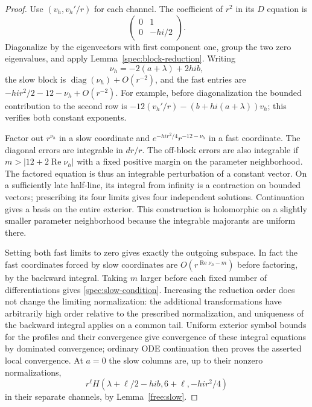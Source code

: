 \documentclass[11pt]{article}
\numberwithin{equation}{section}
\theoremstyle{definition}
\theoremstyle{remark}
\begin{document}
\begin{proof}
Use $(v_h,v_h'/r)$ for each channel. The coefficient of $r^2$ in its
$D$ equation is
\[
 \begin{pmatrix}0&1\\0&-hi/2\end{pmatrix}.
\]
Diagonalize by the eigenvectors with first component one, group the
two zero eigenvalues, and apply Lemma~\ref{spec:block-reduction}.
Writing
\[
 \nu_h=-2(a+\lambda)+2hib,
\]
the slow block is $\operatorname{diag}(\nu_h)+O(r^{-2})$, and the fast
entries are $-hi r^2/2-12-\nu_h+O(r^{-2})$.
For example, before diagonalization the bounded contribution to the
second row is $-12(v_h'/r)-(b+hi(a+\lambda))v_h$; this verifies both
constant exponents.

Factor out $r^{\nu_h}$ in a slow coordinate and
$e^{-hi r^2/4}r^{-12-\nu_h}$ in a fast coordinate. The diagonal errors
are integrable in $d r/r$. The off-block errors are also integrable if
$m>|12+2\operatorname{Re}\nu_h|$ with a fixed positive margin on the
parameter neighborhood. The factored equation is thus an integrable
perturbation of a constant vector. On a sufficiently late half-line,
its integral from infinity is a contraction on bounded vectors;
prescribing its four limits gives four independent solutions.
Continuation gives a basis on the entire exterior. This construction
is holomorphic on a slightly smaller parameter neighborhood because
the integrable majorants are uniform there.

Setting both fast limits to zero gives exactly the outgoing subspace.
In fact the fast coordinates forced by slow coordinates are
$O(r^{\operatorname{Re}\nu_h-m})$ before factoring, by the backward
integral. Taking $m$ larger before each fixed number of differentiations
gives \eqref{spec:slow-condition}. Increasing the reduction order does
not change the limiting normalization: the additional transformations
have arbitrarily high order relative to the prescribed normalization,
and uniqueness of the backward integral applies on a common tail.
Uniform exterior symbol bounds for the profiles and their convergence
give convergence of these integral equations by dominated convergence;
ordinary ODE continuation then proves the asserted local convergence.
At $a=0$ the slow columns are, up to their nonzero normalizations,
\begin{equation}\label{spec:free-bases}
 r^\ell H(\lambda+\ell/2-hib,6+\ell,-hi r^2/4)
\end{equation}
in their separate channels, by Lemma~\ref{free:slow}.


\end{proof}
\end{document}
